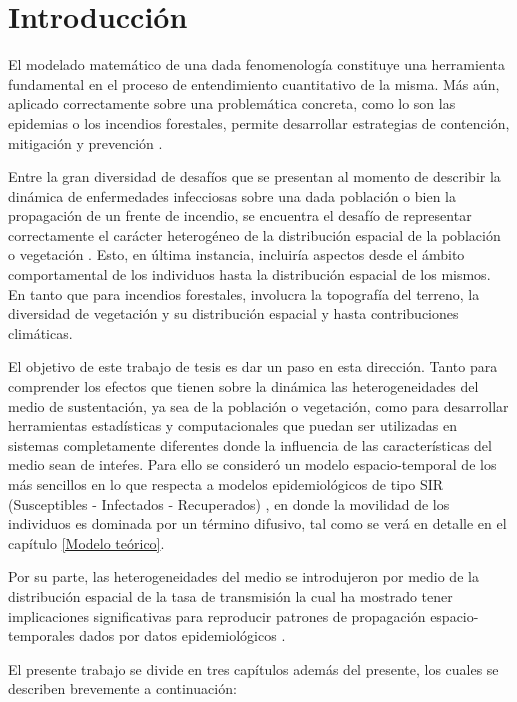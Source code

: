 \chapter{Introducción}
\graphicspath{{figs/}}
\label{Intro}

El modelado matemático de una dada fenomenología constituye una herramienta fundamental en el proceso de entendimiento cuantitativo de la misma. Más aún, aplicado 
correctamente sobre una problemática concreta, como lo son las epidemias o los incendios forestales, permite desarrollar estrategias de contención, mitigación y 
prevención \cite{bressan2009existence}.

Entre la gran diversidad de desafíos que se presentan al momento de describir la dinámica de enfermedades infecciosas sobre una dada población o bien la propagación de un 
frente de incendio, se encuentra el desafío de representar correctamente el carácter heterogéneo de la distribución espacial de la población o vegetación \cite{RILEY201568}.
Esto, en última instancia, incluiría aspectos desde el ámbito comportamental de los individuos hasta la distribución espacial de los mismos. En tanto que para 
incendios forestales, involucra la topografía del terreno, la diversidad de vegetación y su distribución espacial y hasta contribuciones climáticas. 

El objetivo de este trabajo de tesis es dar un paso en esta dirección. Tanto para comprender los efectos que tienen sobre la dinámica las heterogeneidades del medio 
de sustentación, ya sea de la población o vegetación, como para desarrollar herramientas estadísticas y computacionales que puedan ser utilizadas en sistemas 
completamente diferentes donde la influencia de las características del medio sean de inteŕes. Para ello se consideró un modelo espacio-temporal de los más 
sencillos en lo que respecta a modelos epidemiológicos de tipo SIR (Susceptibles - Infectados - Recuperados) \cite{SIR,keeling:infectious_diseases,Noble1974GeographicAT,kolton},
en donde la movilidad de los individuos es dominada por un término difusivo\cite{chuleta}, tal como se verá en detalle en el capítulo \ref{Modelo teórico}. 

Por su parte, las heterogeneidades del medio se introdujeron por medio de la distribución espacial de la tasa de transmisión la cual ha mostrado tener implicaciones 
significativas para reproducir patrones de propagación espacio-temporales dados por datos epidemiológicos \cite{mosquito}.
\newpage

El presente trabajo se divide en tres capítulos además del presente, los cuales se describen brevemente a continuación:

